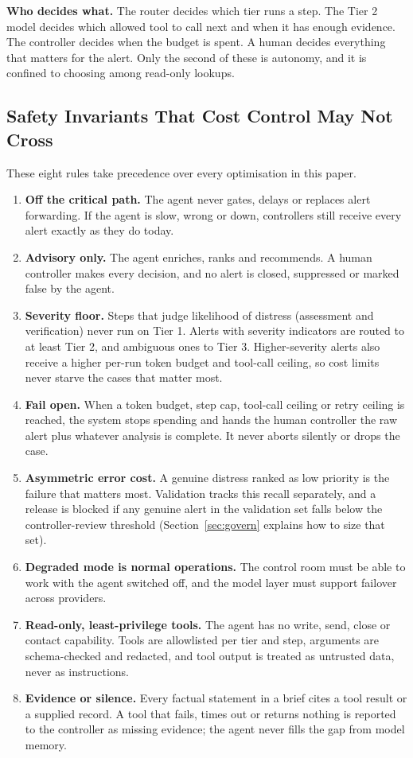 \documentclass[conference]{IEEEtran}
\begin{document}
\textbf{Who decides what.} The router decides which tier runs a step. The Tier 2 model decides which allowed tool to call next and when it has enough evidence. The controller decides when the budget is spent. A human decides everything that matters for the alert. Only the second of these is autonomy, and it is confined to choosing among read-only lookups.

\subsection{Safety Invariants That Cost Control May Not Cross}
\label{sec:invariants}

These eight rules take precedence over every optimisation in this paper.
\begin{enumerate}
\item \textbf{Off the critical path.} The agent never gates, delays or replaces alert forwarding. If the agent is slow, wrong or down, controllers still receive every alert exactly as they do today.
\item \textbf{Advisory only.} The agent enriches, ranks and recommends. A human controller makes every decision, and no alert is closed, suppressed or marked false by the agent.
\item \textbf{Severity floor.} Steps that judge likelihood of distress (assessment and verification) never run on Tier 1. Alerts with severity indicators are routed to at least Tier 2, and ambiguous ones to Tier 3. Higher-severity alerts also receive a higher per-run token budget and tool-call ceiling, so cost limits never starve the cases that matter most.
\item \textbf{Fail open.} When a token budget, step cap, tool-call ceiling or retry ceiling is reached, the system stops spending and hands the human controller the raw alert plus whatever analysis is complete. It never aborts silently or drops the case.
\item \textbf{Asymmetric error cost.} A genuine distress ranked as low priority is the failure that matters most. Validation tracks this recall separately, and a release is blocked if any genuine alert in the validation set falls below the controller-review threshold (Section~\ref{sec:govern} explains how to size that set).
\item \textbf{Degraded mode is normal operations.} The control room must be able to work with the agent switched off, and the model layer must support failover across providers.
\item \textbf{Read-only, least-privilege tools.} The agent has no write, send, close or contact capability. Tools are allowlisted per tier and step, arguments are schema-checked and redacted, and tool output is treated as untrusted data, never as instructions.
\item \textbf{Evidence or silence.} Every factual statement in a brief cites a tool result or a supplied record. A tool that fails, times out or returns nothing is reported to the controller as missing evidence; the agent never fills the gap from model memory.
\end{enumerate}
\end{document}
